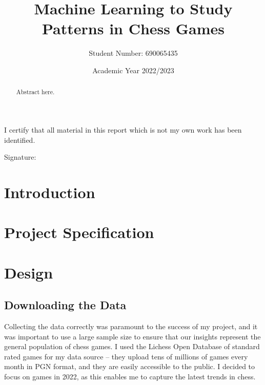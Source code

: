 \documentclass[a4paper, 11pt]{article}
\begin{document}
\title{Machine Learning to Study Patterns in Chess Games}
\author{Student Number: 690065435}
\date{Academic Year 2022/2023}

\maketitle

\begin{abstract}
{Abstract here}.

\begin{center}
\end{center}
\end{abstract}

\vspace*{\fill}
\begin{center}

\vspace{1em}
I certify that all material in this report which is not my own work has been identified.
\end{center}
\vspace{1em}

Signature: \hrulefill

\newpage

\section{Introduction}

\section{Project Specification}

\section{Design}

\subsection{Downloading the Data}
Collecting the data correctly was paramount to the success of my project, and it was important to use a large sample size to ensure that our insights represent the general population of chess games. I used the Lichess Open Database \cite{lichessOpenDatabase} of standard rated games for my data source -- they upload tens of millions of games every month in PGN format, and they are easily accessible to the public. I decided to focus on games in 2022, as this enables me to capture the latest trends in chess.
\end{document}
